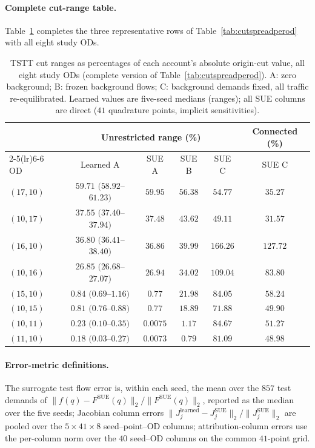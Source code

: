 \paragraph{Complete cut-range table.}
Table~\ref{tab:cutspreadfull} completes the three representative rows of
Table~\ref{tab:cutspreadperod} with all eight study ODs.
\begin{table}[pos=htbp]
\footnotesize
\caption{TSTT cut ranges as percentages of each account's absolute
origin-cut value, all eight study ODs (complete version of
Table~\ref{tab:cutspreadperod}). A: zero background; B: frozen background
flows; C: background demands fixed, all traffic re-equilibrated. Learned
values are five-seed medians (ranges); all SUE columns are direct
($41$ quadrature points, implicit sensitivities).}\label{tab:cutspreadfull}
\footnotesize
\begin{tabular*}{\tblwidth}{@{\extracolsep{\fill}}lccccc}
\toprule
& \multicolumn{4}{c}{Unrestricted range (\%)} & Connected (\%)\\
\cmidrule(lr){2-5}\cmidrule(lr){6-6}
OD & Learned A & SUE A & SUE B & SUE C & SUE C\\
\midrule
$(17,10)$ & $59.71$ $(58.92$--$61.23)$ & $59.95$ & $56.38$ & $54.77$ & $35.27$ \\
$(10,17)$ & $37.55$ $(37.40$--$37.94)$ & $37.48$ & $43.62$ & $49.11$ & $31.57$ \\
$(16,10)$ & $36.80$ $(36.41$--$38.40)$ & $36.86$ & $39.99$ & $166.26$ & $127.72$ \\
$(10,16)$ & $26.85$ $(26.68$--$27.07)$ & $26.94$ & $34.02$ & $109.04$ & $83.80$ \\
$(15,10)$ & $0.84$ $(0.69$--$1.16)$ & $0.77$ & $21.98$ & $84.05$ & $58.24$ \\
$(10,15)$ & $0.81$ $(0.76$--$0.88)$ & $0.77$ & $18.89$ & $71.88$ & $49.90$ \\
$(10,11)$ & $0.23$ $(0.10$--$0.35)$ & $0.0075$ & $1.17$ & $84.67$ & $51.27$ \\
$(11,10)$ & $0.18$ $(0.03$--$0.27)$ & $0.0073$ & $0.79$ & $81.09$ & $48.98$ \\
\bottomrule
\end{tabular*}
\end{table}
\paragraph{Error-metric definitions.}
The surrogate test flow error is, within each seed, the mean over the
$857$ test demands of
$\|f(q)-F^{\mathrm{SUE}}(q)\|_2/\|F^{\mathrm{SUE}}(q)\|_2$, reported
as the median over the five seeds; Jacobian column errors
$\|J_j^{\mathrm{learned}}-J_j^{\mathrm{SUE}}\|_2/\|J_j^{\mathrm{SUE}}\|_2$
are pooled over the $5\times41\times8$ seed--point--OD columns;
attribution-column errors use the per-column norm over the $40$
seed--OD columns on the common $41$-point grid.

